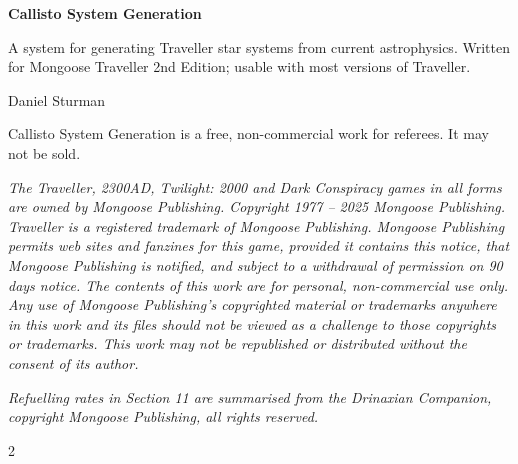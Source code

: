 \documentclass[letterpaper,10pt,openany,oneside]{memoir}
\begin{document}
\thispagestyle{empty}
\vspace*{2in}
{\sffamily\bfseries\color{cal}\Huge Callisto System Generation\par}
\vspace{0.5em}
{\large A system for generating Traveller star systems from current astrophysics. Written for Mongoose Traveller 2nd Edition; usable with most versions of Traveller.\par}
\vspace{1.5em}
{Daniel Sturman\par}
\vfill
{\small Callisto System Generation is a free, non-commercial work for referees. It may not be sold.\par}
\vspace{0.6em}
{\small\itshape The Traveller, 2300AD, Twilight: 2000 and Dark Conspiracy games in all forms are owned by Mongoose Publishing. Copyright 1977 -- 2025 Mongoose Publishing. Traveller is a registered trademark of Mongoose Publishing. Mongoose Publishing permits web sites and fanzines for this game, provided it contains this notice, that Mongoose Publishing is notified, and subject to a withdrawal of permission on 90 days notice. The contents of this work are for personal, non-commercial use only. Any use of Mongoose Publishing's copyrighted material or trademarks anywhere in this work and its files should not be viewed as a challenge to those copyrights or trademarks. This work may not be republished or distributed without the consent of its author.\par}
\vspace{0.6em}
{\small\itshape Refuelling rates in Section 11 are summarised from the Drinaxian Companion, copyright \textcopyright{} Mongoose Publishing, all rights reserved.\par}
\newpage
\tableofcontents*
\clearpage
\listoftables*
\clearpage

\begin{multicols}{2}

\end{multicols}
\end{document}
